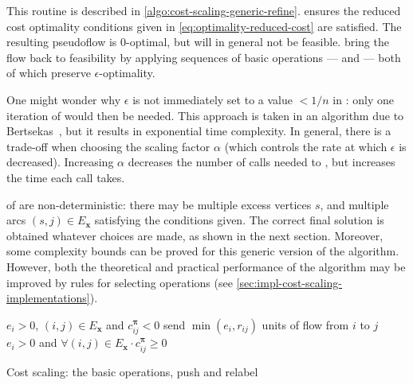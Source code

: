 This routine is described in \cref{algo:cost-scaling-generic-refine}.  ensures the reduced cost optimality conditions given in \cref{eq:optimality-reduced-cost} are satisfied. The resulting pseudoflow is $0$-optimal, but will in general not be feasible.  bring the flow back to feasibility by applying sequences of basic operations ---  and  --- both of which preserve $\epsilon$-optimality.

One might wonder why $\epsilon$ is not immediately set to a value $< 1/n$ in : only one iteration of  would then be needed. This approach is taken in an algorithm due to Bertsekas~\cite{Bertsekas:1985}, but it results in exponential time complexity. In general, there is a trade-off when choosing the scaling factor $\alpha$ (which controls the rate at which $\epsilon$ is decreased). Increasing $\alpha$ decreases the number of calls needed to , but increases the time each call takes\footnotemark.

 of  are non-deterministic: there may be multiple excess vertices $s$, and multiple arcs $(s,j) \in E_\mathbf{x}$ satisfying the conditions given. The correct final solution is obtained whatever choices are made, as shown in the next section. Moreover, some complexity bounds can be proved for this generic version of the algorithm. However, both the theoretical and practical performance of the algorithm may be improved by rules for selecting operations (see \cref{sec:impl-cost-scaling-implementations}).

\begin{algorithm}
\begin{algorithmic}[1]
    \Require $e_i > 0$, $(i,j) \in E_{\mathbf{x}}$ and $c^{\boldsymbol{\pi}}_{ij} < 0$
        \State send $\min\left(e_i, r_{ij}\right)$ units of flow from $i$ to $j$
    \EndFunction
    \setcounter{ALG@line}{0}
    \Statex
    \Require $e_i > 0$ and $\forall(i,j) \in E_{\mathbf{x}} \cdot c^{\boldsymbol{\pi}}_{ij} \geq 0$
    \EndFunction
\end{algorithmic}
\caption{Cost scaling: the basic operations, push and relabel}
\label{algo:cost-scaling-operations}
\end{algorithm}

